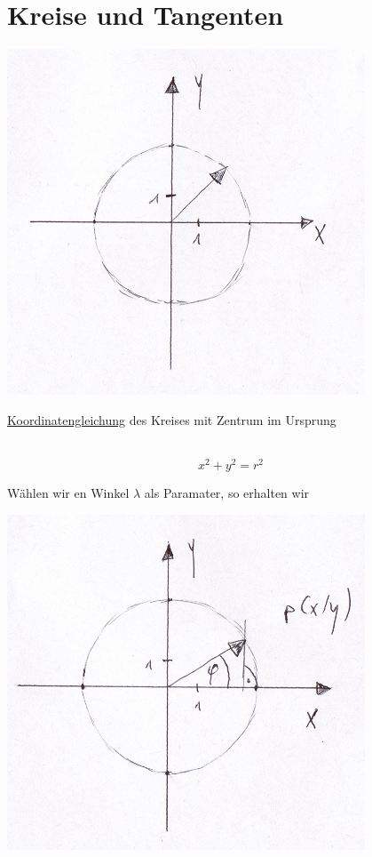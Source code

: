 \chapter{Kreise und Tangenten}
\begin{center}
	 \includegraphics[width=0.8\textwidth]{imgs/Kreis_Koordinatengleichung.png}
 \end{center}
\underline{Koordinatengleichung} des Kreises mit Zentrum im Ursprung\\
\\
\begin{mathbox}
	\begin{equation*}x^2 + y^2 = r^2\end{equation*}
\end{mathbox}
\noindent
Wählen wir en Winkel $\lambda$ als Paramater, so erhalten wir\\
\begin{center}
	 \includegraphics[width=0.8\textwidth]{imgs/Kreis_Parametergleichung.png}
\end{center}
